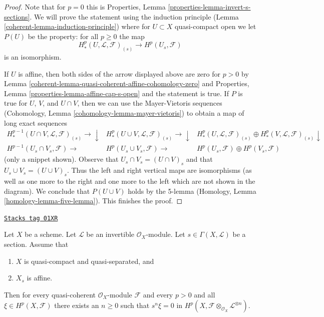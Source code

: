 \begin{proof}

Note that for $p = 0$ this is
Properties, Lemma \ref{properties-lemma-invert-s-sections}.
We will prove the statement using the induction
principle (Lemma \ref{coherent-lemma-induction-principle}) where for
$U \subset X$ quasi-compact open we let $P(U)$ be the property:
for all $p \geq 0$ the map
$$
H^p_*(U, \mathcal{L}, \mathcal{F})_{(s)}
\longrightarrow
H^p(U_s, \mathcal{F})
$$
is an isomorphism.

\medskip\noindent
If $U$ is affine, then both sides of the arrow displayed above
are zero for $p > 0$ by
Lemma \ref{coherent-lemma-quasi-coherent-affine-cohomology-zero}
and
Properties, Lemma \ref{properties-lemma-affine-cap-s-open}
and the statement is true. If $P$ is true for $U$, $V$, and $U \cap V$,
then we can use the Mayer-Vietoris sequences
(Cohomology, Lemma \ref{cohomology-lemma-mayer-vietoris}) to obtain
a map of long exact sequences
$$
\begin{array}{ccc}H^{p - 1}_*(U \cap V, \mathcal{L}, \mathcal{F})_{(s)} \longrightarrow\downarrow & H^p_*(U \cup V, \mathcal{L}, \mathcal{F})_{(s)} \longrightarrow\downarrow & H^p_*(U, \mathcal{L}, \mathcal{F})_{(s)}
\oplus
H^p_*(V, \mathcal{L}, \mathcal{F})_{(s)} \downarrow \\ H^{p - 1}(U_s \cap V_s, \mathcal{F}) \longrightarrow & H^p(U_s \cup V_s, \mathcal{F}) \longrightarrow & H^p(U_s, \mathcal{F})
\oplus
H^p(V_s, \mathcal{F})\end{array}
$$
(only a snippet shown). Observe that $U_s \cap V_s = (U \cap V)_s$ and
that $U_s \cup V_s = (U \cup V)_s$. Thus the left and right vertical
maps are isomorphisms (as well as one more to the right and one more
to the left which are not shown in the diagram).
We conclude that $P(U \cup V)$ holds by
the 5-lemma (Homology, Lemma \ref{homology-lemma-five-lemma}).
This finishes the proof.
\end{proof}

\begin{lemma}
\label{coherent-lemma-section-affine-open-kills-classes}
\href{https://stacks.math.columbia.edu/tag/01XR}{\texttt{Stacks tag 01XR}}

Let $X$ be a scheme.
Let $\mathcal{L}$ be an invertible $\mathcal{O}_X$-module.
Let $s \in \Gamma(X, \mathcal{L})$ be a section.
Assume that
\begin{enumerate}
\item $X$ is quasi-compact and quasi-separated, and
\item $X_s$ is affine.
\end{enumerate}
Then for every quasi-coherent $\mathcal{O}_X$-module $\mathcal{F}$ and
every $p > 0$ and all $\xi \in H^p(X, \mathcal{F})$ there exists
an $n \geq 0$ such that $s^n\xi = 0$ in
$H^p(X, \mathcal{F} \otimes_{\mathcal{O}_X} \mathcal{L}^{\otimes n})$.
\end{lemma}


